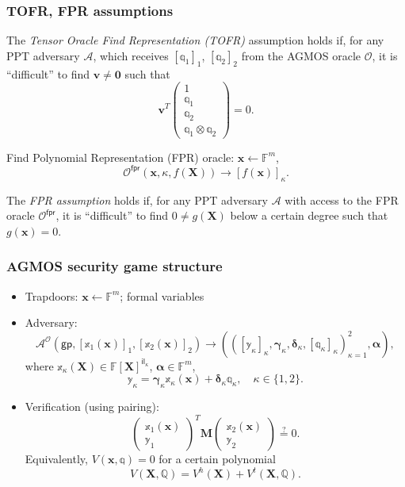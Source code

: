 \documentclass[9pt]{beamer}
\newcommand{\F}{\mathbb{F}}
\newcommand{\A}{\mathcal A}  %
\newcommand{\gp}{\mathsf{gp}}  %
\newcommand{\Oracle}{\mathcal{O}}  %
\newcommand{\il}{\mathsf{il}}  %
\newcommand{\fpr}{\mathsf{fpr}}  %
\begin{document}
\begin{frame}
\frametitle{TOFR, FPR assumptions}
\begin{definition}[informal]
    The \emph{Tensor Oracle Find Representation (TOFR)} assumption holds if, for any PPT adversary $ \A $, which receives $ [\mathbb q_1]_1 $, $ [\mathbb q_2]_2 $ from the AGMOS oracle $ \Oracle $, it is ``difficult'' to find $ \bm v \neq \bm 0 $ such that
    \[
    \bm v^T 
    \begin{pmatrix}
         1 \\
         \mathbb q_1 \\
         \mathbb q_2 \\
         \mathbb q_1 \otimes \mathbb q_2
    \end{pmatrix}
    = 0.
    \]
\end{definition}
Find Polynomial Representation (FPR) oracle: $ \bm x \gets \F^m $, 
\[ 
\Oracle^\fpr(\bm x, \kappa, f(\bm X)) \to [f(\bm x)]_\kappa.
\]
\begin{definition}[informal]
    The \textit{FPR assumption} holds if, for any PPT adversary $ \A $ with access to the FPR oracle $ \Oracle^\fpr $, it is ``difficult'' to find $ 0 \neq g(\bm X) $ below a certain degree such that $ g(\bm x) = 0 $.
\end{definition}
\end{frame}


\begin{frame}
\frametitle{AGMOS security game structure}
\begin{itemize}
    \item Trapdoors: $ \bm x \gets \F^m $; formal variables 
    \item Adversary:
    \[
    \A^\Oracle(\gp, [\mathbb x_1(\bm x)]_1, [\mathbb x_2(\bm x)]_2) \to
    (([\mathbb y_\kappa]_\kappa, \bm \gamma_\kappa, \bm \delta_\kappa, [\mathbb q_\kappa]_\kappa)_{\kappa=1}^2, \bm \alpha),
    \]
    where $ \mathbb x_\kappa(\bm X) \in \F[\bm X]^{\il_\kappa} $, $ \bm \alpha \in \F^m $, 
    \[
    \mathbb y_\kappa = \bm{\gamma}_\kappa \mathbb x_\kappa(\bm x) + \bm \delta_\kappa \mathbb q_\kappa, \quad 
    \kappa \in \{ 1, 2 \}.
    \]
    \item Verification (using pairing):
    \[
        \begin{pmatrix}
           \mathbb x_1(\bm x) \\
           \mathbb y_1
        \end{pmatrix}^T
        \bm M
        \begin{pmatrix}
           \mathbb x_2(\bm x) \\
           \mathbb y_2
        \end{pmatrix} \overset{?}{=} 0.
    \]
    Equivalently, $ V(\bm x, \mathbb q) = 0 $ for a certain polynomial
    \[
    V(\bm X, \mathbb Q) = V^h(\bm X) + V^t(\bm X, \mathbb Q).
    \]
\end{itemize}
\end{frame}
\end{document}
